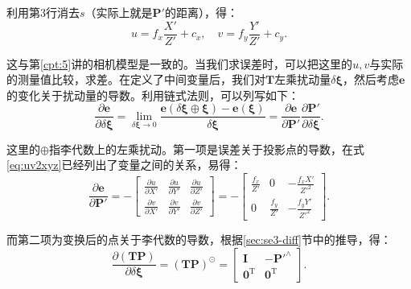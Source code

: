 利用第3行消去$s$（实际上就是$\bm{P}'$的距离），得：
\begin{equation}
\label{eq:uv2xyz}
u = {f_x}\frac{{X'}}{{Z'}} + {c_x}, \quad v = {f_y}\frac{{Y'}}{{Z'}} + {c_y}.
\end{equation}

这与第\ref{cpt:5}讲的相机模型是一致的。当我们求误差时，可以把这里的$u,v$与实际的测量值比较，求差。在定义了中间变量后，我们对$\bm{T}$左乘扰动量$\delta \boldsymbol{\xi}$，然后考虑$\bm{e}$的变化关于扰动量的导数。利用链式法则，可以列写如下：
\begin{equation}
\frac{{\partial \bm{e}}}{{\partial \delta \boldsymbol{\xi} }} = \mathop {\lim }\limits_{\delta \boldsymbol{\xi}  \to 0} \frac{{\bm{e}\left( {\delta \boldsymbol{\xi}  \oplus \boldsymbol{\xi} } \right)-\bm{e}(\boldsymbol{\xi})}}{{\delta \boldsymbol{\xi} }}  = \frac{{\partial \bm{e}}}{{\partial \bm{P}'}}\frac{{\partial \bm{P}'}}{{\partial \delta \boldsymbol{\xi} }}.
\end{equation}

这里的$\oplus$指李代数上的左乘扰动。第一项是误差关于投影点的导数，在式\eqref{eq:uv2xyz}已经列出了变量之间的关系，易得：
\begin{equation}
\frac{{\partial \bm{e}}}{{\partial \bm{P}'}} = -\left[ 
{\begin{array}{*{20}{c}}
	{\frac{{\partial u}}{{\partial X'}}}&{\frac{{\partial u}}{{\partial Y'}}}&{\frac{{\partial u}}{{\partial Z'}}}\\
	{\frac{{\partial v}}{{\partial X'}}}&{\frac{{\partial v}}{{\partial Y'}}}&{\frac{{\partial v}}{{\partial Z'}}}
	\end{array}} \right] 
= - \left[ {\begin{array}{*{20}{c}}
	{\frac{{{f_x}}}{Z'}}&0&{ - \frac{{{f_x}X'}}{{{Z'^2}}}}\\
	0&{\frac{{{f_y}}}{Z'}}&{ - \frac{{{f_y}Y'}}{Z'^2}}
\end{array}} \right].
\end{equation}

而第二项为变换后的点关于李代数的导数，根据\ref{sec:se3-diff}节中的推导，得：
\begin{equation}
\frac{{\partial \left( \bm{TP} \right)}}{{\partial \delta \boldsymbol{\xi} }} = {\left( \bm{TP} \right)^ \odot } = \left[ 
\begin{array}{*{20}{cc}}
\bm{I} &- \bm{P}'^ \wedge \\
\bm{0}^\mathrm{T} &\bm{0}^\mathrm{T} 
\end{array}
\right].
\end{equation}


